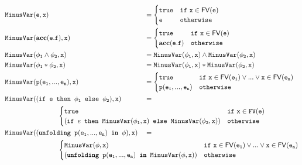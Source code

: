 \documentclass {llncs}
\begin{document}
\begin{scenter}
        \begin{alignat*}{2}
            & \minusVar{e}{x}
            &&= \begin{cases}
            		\phiTrue & \mathtt{if~ x \in \FV(e)} \\
            		\mathtt{e} & \mathtt{otherwise}
            		\end{cases} \\
            & \minusVar{\phiAcc{e}{f}}{x}
            &&= \begin{cases}
            		\phiTrue & \mathtt{if~ x \in \FV(e)} \\
            		\phiAcc{e}{f} & \mathtt{otherwise}
            		\end{cases} \\
            & \minusVar{\phi_1 \wedge \phi_2}{x}
            &&= \minusVar{\phi_1}{x} \wedge \minusVar{\phi_2}{x} \\
            & \minusVar{\phi_1 \ast \phi_2}{x}
            &&=  \minusVar{\phi_1}{x} \ast \minusVar{\phi_2}{x} \\
            & \minusVar{p(e_1,...,e_n)}{x}
            &&=  \begin{cases}
            		\phiTrue & \mathtt{if~ x \in \FV(e_1) \vee ... \vee x \in \FV(e_n)} \\
            		\mathtt{p(e_1,...,e_n)} & \mathtt{otherwise}
            		\end{cases} \\
            & \minusVar{\phiCond{e}{\phi_1}{\phi_2}}{x}
            &&=  \\
            &&& \hspace{-4.5cm}\begin{cases}
            		\phiTrue & \mathtt{if~ x \in FV(e)} \\
            		\phiCond{e}{\minusVar{\phi_1}{x}}{\minusVar{\phi_2}{x}} & \mathtt{otherwise}
            		\end{cases} \\
            & \minusVar{\unfolding{p(e_1,...,e_n)}{\phi}}{x}
            &&= \\
            &&& \hspace{-4.5cm}\begin{cases}
            		\minusVar{\phi}{x} & \mathtt{if~ x \in \FV(e_1) \vee ... \vee x \in \FV(e_n)} \\
            		\unfolding{\mathtt{p(e_1,...,e_n)}}{\minusVar{\phi}{x}} & \mathtt{otherwise}
            		\end{cases} \\
        \end{alignat*}
    \end{scenter}
\end{document}
